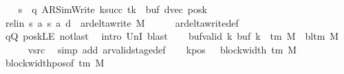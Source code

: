 \begin{isabellebody}
\ \ \isamarkupfalse%
\ {\isacharquery}{\kern0pt}s{\isacharprime}{\kern0pt}\ {\isacharequal}{\kern0pt}\ {\isachardoublequoteopen}{\isacharparenleft}{\kern0pt}q{\isacharcomma}{\kern0pt}\ AR{\isacharunderscore}{\kern0pt}SimWrite{\isacharcomma}{\kern0pt}\ k{\isacharunderscore}{\kern0pt}succ\ tk{\isacharcomma}{\kern0pt}\ {}{\isacharcomma}{\kern0pt}\ buf{\isacharcomma}{\kern0pt}\ dvec{\isacharcomma}{\kern0pt}\ posk{\isacharparenright}{\kern0pt}{\isachardoublequoteclose}\isanewline
\ \ \isamarkupfalse%
\ rel{\isacharunderscore}{\kern0pt}in{\isacharcolon}{\kern0pt}\ {\isachardoublequoteopen}{\isacharparenleft}{\kern0pt}{\isacharquery}{\kern0pt}s{\isacharcomma}{\kern0pt}\ {\isacharquery}{\kern0pt}a{\isacharcomma}{\kern0pt}\ {\isacharquery}{\kern0pt}s{\isacharprime}{\kern0pt}{\isacharcomma}{\kern0pt}\ {\isacharquery}{\kern0pt}a{\isacharcomma}{\kern0pt}\ {\isacharquery}{\kern0pt}d{\isacharparenright}{\kern0pt}\ {\isasymin}\ ar{\isacharunderscore}{\kern0pt}delta{\isacharunderscore}{\kern0pt}write\ M{\isachardoublequoteclose}\isanewline
\ \ \ \ \isamarkupfalse%
\ ar{\isacharunderscore}{\kern0pt}delta{\isacharunderscore}{\kern0pt}write{\isacharunderscore}{\kern0pt}def\isanewline
\ \ \ \ \isamarkupfalse%
\ qQ\ poskLE\ notlast\ \isamarkupfalse%
\ {\isacharparenleft}{\kern0pt}intro\ UnI{}{\isacharparenright}{\kern0pt}\ blast\isanewline
\ \ \isamarkupfalse%
\ buf{\isacharunderscore}{\kern0pt}valid{\isacharcolon}{\kern0pt}\ {\isachardoublequoteopen}{\isasymforall}k{\isachardot}{\kern0pt}\ buf\ k\ {\isasymin}\ {\isasymGamma}{\isacharunderscore}{\kern0pt}tm\ M\ {\isasymunion}\ {\isacharbraceleft}{\kern0pt}bl{\isacharunderscore}{\kern0pt}tm\ M{\isacharbraceright}{\kern0pt}{\isachardoublequoteclose}\isanewline
\ \ \ \ \isamarkupfalse%
\ vsrc\ \isamarkupfalse%
\ {\isacharparenleft}{\kern0pt}simp\ add{\isacharcolon}{\kern0pt}\ ar{\isacharunderscore}{\kern0pt}valid{\isacharunderscore}{\kern0pt}stage{\isacharunderscore}{\kern0pt}def{\isacharparenright}{\kern0pt}\isanewline
\ \ \isamarkupfalse%
\ kpos{\isacharcolon}{\kern0pt}\ {\isachardoublequoteopen}{}\ {\isacharless}{\kern0pt}\ block{\isacharunderscore}{\kern0pt}width\ {\isacharparenleft}{\kern0pt}{\isasymGamma}{\isacharunderscore}{\kern0pt}tm\ M{\isacharparenright}{\kern0pt}{\isachardoublequoteclose}\ \isamarkupfalse%
\ block{\isacharunderscore}{\kern0pt}width{\isacharunderscore}{\kern0pt}pos{\isacharbrackleft}{\kern0pt}of\ {\isachardoublequoteopen}{\isasymGamma}{\isacharunderscore}{\kern0pt}tm\ M{\isachardoublequoteclose}{\isacharbrackright}{\kern0pt}\ \isamarkupfalse%

\end{isabellebody}
